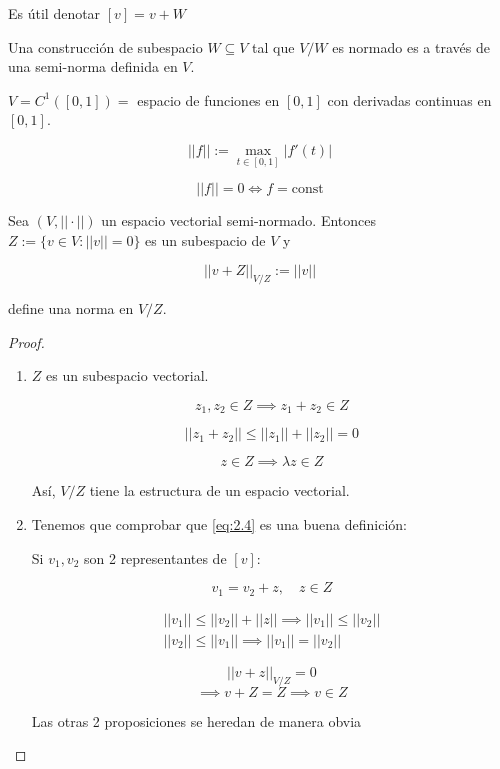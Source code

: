 Es útil denotar $[v]=v+W$

Una construcción de subespacio $W\subseteq V$ tal que $V/W$ es normado es a través de una \color{red} semi-norma \color{black} definida en $V$.

\begin{fexample}
    $V=C^1([0,1])=$ espacio de funciones en $[0,1]$ con derivadas continuas en $[0,1]$.

    \[||f||:=\max_{t\in [0,1]}|f'(t)|\]

    \[||f||=0\iff f=\text{const}\]
\end{fexample}

\begin{ftheorem}
    Sea $(V,||\cdot||)$ un espacio vectorial semi-normado. Entonces $Z:=\{v\in V:||v||=0\}$ es un subespacio de $V$ y
    
    \begin{equation}||v+Z||_{V/Z}:=||v||\label{eq:2.4}\end{equation}
    
    define una norma en $V/Z$.
\end{ftheorem}

\begin{proof}
    \begin{enumerate}
        \item $Z$ es un subespacio vectorial.
        
        \[z_1,z_2\in Z\implies z_1+z_2\in Z\]

        \[||z_1+z_2||\leq ||z_1||+||z_2||=0\]

        \[z\in Z\implies \lambda z\in Z\]

        Así, $V/Z$ tiene la estructura de un espacio vectorial.

        \item Tenemos que comprobar que \ref{eq:2.4} es una buena definición:

        Si $v_1,v_2$ son 2 representantes de $[v]$:

        \[v_1=v_2+z,\quad z\in Z\]

        \begin{align*}
            ||v_1||\leq ||v_2||+||z||\implies ||v_1||\leq ||v_2||\\
            ||v_2||\leq ||v_1||\implies ||v_1||=||v_2||
        \end{align*}

        \[||v+z||_{V/Z}=0\]
        \[\implies v+Z=Z\implies v\in Z\]

        Las otras 2 proposiciones se heredan de manera obvia
    \end{enumerate}
\end{proof}


